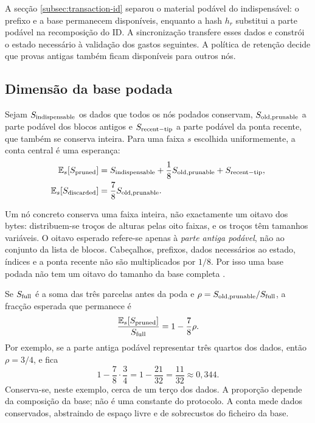 A secção \ref{subsec:transaction-id} separou o material podável do
indispensável: o prefixo e a base permanecem disponíveis, enquanto a hash
\(h_r\) substitui a parte podável na recomposição do ID. A sincronização
transfere esses dados e constrói o estado necessário à validação dos gastos
seguintes. A política de retenção decide que provas antigas também ficam
disponíveis para outros nós.


\subsection{Dimensão da base podada}
\label{subsec:pruning-size}

Sejam \(S_{\rm indispensable}\) os dados que todos os nós podados conservam,
\(S_{\rm old,prunable}\) a parte podável dos blocos antigos e
\(S_{\rm recent-tip}\) a parte podável da ponta recente, que também se
conserva inteira. Para uma faixa \(s\) escolhida uniformemente, a conta central
é uma esperança:
\begin{align}
 \mathbb E_s[S_{\rm pruned}]
   &=S_{\rm indispensable}
     +\frac18 S_{\rm old,prunable}
     +S_{\rm recent-tip},
 \label{eq:pruned-database-size}\\
 \mathbb E_s[S_{\rm discarded}]
   &=\frac78 S_{\rm old,prunable}.
 \label{eq:pruned-database-discarded}
\end{align}

Um nó concreto conserva uma faixa inteira, não exactamente um oitavo dos
bytes: distribuem-se troços de alturas pelas oito faixas, e os troços têm
tamanhos variáveis. O oitavo esperado refere-se apenas à \emph{parte antiga
podável}, não ao conjunto da lista de blocos. Cabeçalhos, prefixos, dados
necessários ao estado, índices e a
ponta recente não são multiplicados por \(1/8\). Por isso uma base podada não
tem um oitavo do tamanho da base completa \cite{monero-pruning-doc}.

Se \(S_{\rm full}\) é a soma das três parcelas antes da poda e
\(\rho=S_{\rm old,prunable}/S_{\rm full}\), a fracção esperada que permanece
é
\[
 \frac{\mathbb E_s[S_{\rm pruned}]}{S_{\rm full}}
   =1-\frac78\rho.
\]
Por exemplo, se a parte antiga podável representar três quartos dos dados,
então \(\rho=3/4\), e fica
\[
 1-\frac78\cdot\frac34=1-\frac{21}{32}
   =\frac{11}{32}\approx0{,}344.
\]
Conserva-se, neste exemplo, cerca de um terço dos dados. A proporção depende
da composição da base; não é uma constante do protocolo. A conta mede dados
conservados, abstraindo de espaço livre e de sobrecustos do ficheiro da base.


